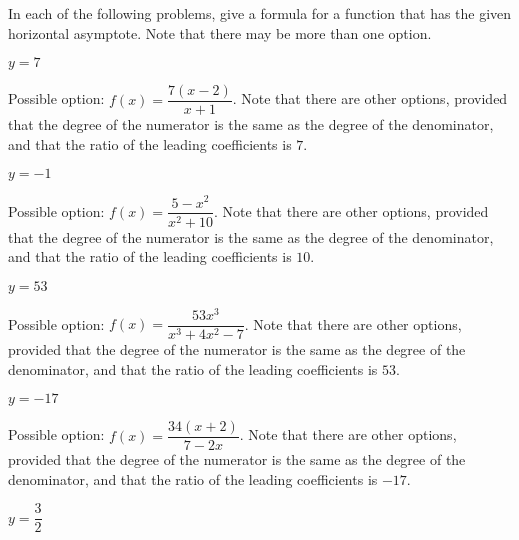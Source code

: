 \begin{exercises}
	 \begin{problem}
	 In each of the following problems, give a formula for a function that
	 has the given horizontal asymptote. Note that there may be more than one option.
	 \begin{multicols}{4}
		 \begin{subproblem}
			 $y=7$
			 \begin{shortsolution}
				 Possible option: $f(x)=\dfrac{7(x-2)}{x+1}$. Note that there
				 are other options, provided that the degree of the numerator is the same as the degree
				 of the denominator, and that the ratio of the leading
				 coefficients is $7$.
			 \end{shortsolution}
		 \end{subproblem}
		 \begin{subproblem}
			 $y=-1$
			 \begin{shortsolution}
				 Possible option: $f(x)=\dfrac{5-x^2}{x^2+10}$. Note that there
				 are other options, provided that the degree of the numerator is the same as the degree
				 of the denominator, and that the ratio of the leading
				 coefficients is $10$.
			 \end{shortsolution}
		 \end{subproblem}
		 \begin{subproblem}
			 $y=53$
			 \begin{shortsolution}
				 Possible option: $f(x)=\dfrac{53x^3}{x^3+4x^2-7}$. Note that there
				 are other options, provided that the degree of the numerator is the same as the degree
				 of the denominator, and that the ratio of the leading
				 coefficients is $53$.
			 \end{shortsolution}
		 \end{subproblem}
		 \begin{subproblem}
			 $y=-17$
			 \begin{shortsolution}
				 Possible option: $f(x)=\dfrac{34(x+2)}{7-2x}$. Note that there
				 are other options, provided that the degree of the numerator is the same as the degree
				 of the denominator, and that the ratio of the leading
				 coefficients is $-17$.
			 \end{shortsolution}
		 \end{subproblem}
		 \begin{subproblem}
			 $y=\dfrac{3}{2}$
			 \begin{shortsolution}

\end{shortsolution}
\end{subproblem}
\end{multicols}
\end{problem}
\end{exercises}
